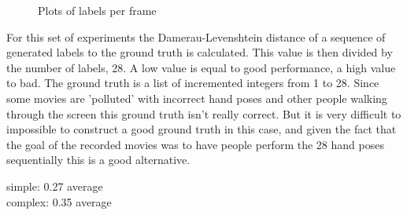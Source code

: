 \begin{figure}[h]
\begin{center}
\hspace{0.03\linewidth}
	\hspace{0.03\linewidth}
\end{center}
\caption{Plots of labels per frame}
\label{fig:performances}
\end{figure}

For this set of experiments the Damerau-Levenshtein distance of a sequence of generated labels to the ground truth is calculated. This value is then divided by the number of labels, 28. A low value is equal to good performance, a high value to bad. The ground truth is a list of incremented integers from 1 to 28. Since some movies are 'polluted' with incorrect hand poses and other people walking through the screen this ground truth isn't really correct. But it is very difficult to impossible to construct a good ground truth in this case, and given the fact that the goal of the recorded movies was to have people perform the 28 hand poses sequentially this is a good alternative.

simple: 0.27 average\\
complex: 0.35 average\\

